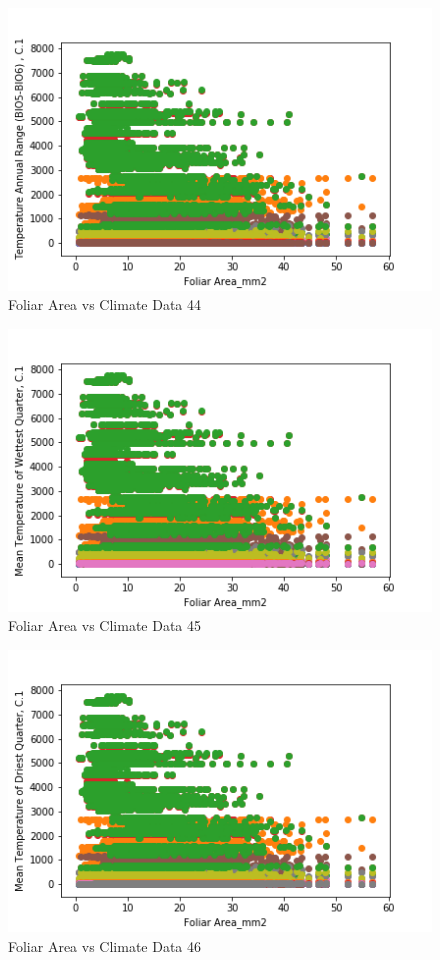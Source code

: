 \documentclass[letterpaper]{article}
\begin{document}
\begin{figure}[h]
\caption{Foliar Area vs Climate Data 44\label{fig:Foliar_Area_vs_44}}
\centering
\includegraphics[width=0.7\paperwidth]{Foliar_Area_vs_44}
\end{figure}


\begin{figure}[h]
\caption{Foliar Area vs Climate Data 45\label{fig:Foliar_Area_vs_45}}
\centering
\includegraphics[width=0.7\paperwidth]{Foliar_Area_vs_45}
\end{figure}


\begin{figure}[h]
\caption{Foliar Area vs Climate Data 46\label{fig:Foliar_Area_vs_46}}
\centering
\includegraphics[width=0.7\paperwidth]{Foliar_Area_vs_46}
\end{figure}
\end{document}
